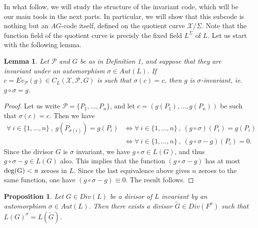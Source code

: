 \documentclass[10pt]{article}
\newtheorem{prop1}{Proposition}[]
\newtheorem{lem1}{Lemma}[]
\newcommand{\s}{\vspace{0.3cm}}
\newcommand{\X}{\mathcal{X}}
\newcommand{\PR}{\mathcal{P}}
\begin{document}
In what follow, we will study the structure of the invariant code, which will be our main tools in the next parts. In particular, we will show that this subcode is nothing but an $AG$-code itself, defined on the quotient curve $\X/\Sigma$. Note that the function field of the quotient curve is precisly the fixed field $L^{\Sigma}$ of $L$. Let us start with the following lemma.

\s

\begin{lem1} \label{inv}
Let $\PR$ and $G$ be as in Definition 1, and suppose that they are invariant under an automorphism $\sigma \in Aut(L)$. If $c = Ev_{\PR}(g) \in C_L(\X,\PR,G)$ is such that $\sigma(c) = c$, then $g$ is $\sigma$-invariant, ie. $g\circ \sigma = g$. 
\end{lem1}

\s

\begin{proof}
Let us write $\PR = \{P_1,...,P_n\}$, and let $c=(g(P_1),...,g(P_n))$ be such that $\sigma(c)=c$. Then we have 
\begin{align*}
\forall \ i \in \{1,...,n\} \ , \ g(P_{\sigma(i)}) = g(P_i) &\iff \forall \ i \in \{1,...,n\} \ , \ (g \circ \sigma)(P_i) =g(P_i) \\
& \iff \forall \ i \in \{1,...,n\} \ , \ (g\circ \sigma - g)(P_i) = 0.
\end{align*}
Since the divisor $G$ is $\sigma$ invariant, we have $g \circ \sigma \in L(G)$, and thus $g\circ \sigma - g \in L(G)$ also. This implies that the function $(g \circ \sigma - g)$ has at most $\rm{deg}(G)<\it{n}$ zeroes in $L$. Since the last equivalence above gives $n$ zeroes to the same function, one have $(g \circ \sigma - g) \equiv 0$. The result follows.
\end{proof}

\s

\begin{prop1} \label{invrr}
Let $G \in Div(L)$ be a divisor of $L$ invariant by an automorphism $\sigma \in Aut(L)$. Then there exists a divisor $\tilde{G} \in Div(F^{\sigma})$ such that $L(G)^{\sigma} = L(\tilde{G})$.
\end{prop1}

\s
\end{document}
